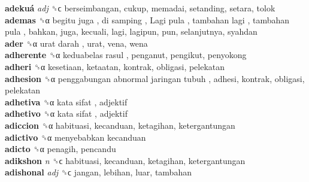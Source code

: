 \textbf{adekuá} \emph{adj}  ␝ϲ  berseimbangan, cukup, memadai, setanding, setara, tolok  \\
\textbf{ademas} ␝α   begitu juga ,  di samping ,  Lagi pula ,  tambahan lagi ,  tambahan pula , bahkan, juga, kecuali, lagi, lagipun, pun, selanjutnya, syahdan  \\
\textbf{ader} ␝α   urat darah , urat, vena, wena  \\
\textbf{adherente} ␝α   keduabelas rasul , penganut, pengikut, penyokong  \\
\textbf{adheri} ␝α  kesetiaan, ketaatan, kontrak, obligasi, pelekatan  \\
\textbf{adhesion} ␝α   penggabungan abnormal jaringan tubuh , adhesi, kontrak, obligasi, pelekatan  \\
\textbf{adhetiva} ␝α   kata sifat , adjektif  \\
\textbf{adhetivo} ␝α   kata sifat , adjektif  \\
\textbf{adiccion} ␝α  habituasi, kecanduan, ketagihan, ketergantungan  \\
\textbf{adictivo} ␝α   menyebabkan kecanduan   \\
\textbf{adicto} ␝α  penagih, pencandu  \\
\textbf{adikshon} \emph{n}  ␝ϲ  habituasi, kecanduan, ketagihan, ketergantungan  \\
\textbf{adishonal} \emph{adj}  ␝ϲ  jangan, lebihan, luar, tambahan  \\
